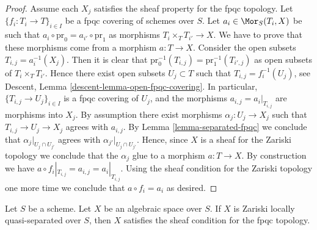 \begin{proof}
Assume each $X_j$ satisfies the sheaf property for the fpqc topology.
Let $\{f_i : T_i \to T\}_{i \in I}$ be a fpqc covering of schemes over $S$.
Let $a_i \in \Mor_S(T_i, X)$ be such that
$a_i \circ \text{pr}_0 = a_{i'} \circ \text{pr}_1$ as morphisms
$T_i \times_T T_{i'} \to X$. We have to prove that these morphisms
come from a morphism $a : T \to X$. Consider the open subsets
$T_{i, j} = a_i^{-1}(X_j)$. Then it is clear that
$\text{pr}_0^{-1}(T_{i, j}) = \text{pr}_1^{-1}(T_{i', j})$ as open
subsets of $T_i \times_T T_{i'}$. Hence there exist open subsets
$U_j \subset T$ such that $T_{i, j} = f_i^{-1}(U_j)$, see
Descent, Lemma \ref{descent-lemma-open-fpqc-covering}.
In particular, $\{T_{i, j} \to U_j\}_{i \in I}$ is a fpqc covering
of $U_j$, and the morphisms $a_{i, j} = a_i|_{T_{i, j}}$ are morphisms
into $X_j$. By assumption there exist morphisms $\alpha_j : U_j \to X_j$
such that $T_{i, j} \to U_j \to X_j$ agrees with $a_{i, j}$.
By Lemma \ref{lemma-separated-fpqc} we conclude that
$\alpha_j|_{U_j \cap U_{j'}}$ agrees with $\alpha_{j'}|_{U_j \cap U_{j'}}$.
Hence, since $X$ is a sheaf for the Zariski topology we conclude that
the $\alpha_j$ glue to a morphism $a : T \to X$.
By construction we have $a \circ f_i|_{T_{i, j}} = a_{i, j} = a_i|_{T_{i, j}}$.
Using the sheaf condition for the Zariski topology one more time we
conclude that $a \circ f_i = a_i$ as desired.
\end{proof}

\begin{lemma}
\label{lemma-sheaf-fpqc-quasi-separated}
Let $S$ be a scheme.
Let $X$ be an algebraic space over $S$.
If $X$ is Zariski locally quasi-separated over $S$, then $X$ satisfies
the sheaf condition for the fpqc topology.
\end{lemma}

